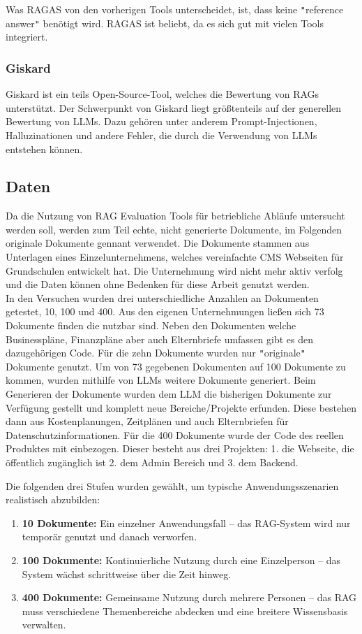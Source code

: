 Was RAGAS von den vorherigen Tools unterscheidet, ist, dass keine \texttt{"}reference answer\texttt{"} benötigt wird.
RAGAS ist beliebt, da es sich gut mit vielen Tools integriert. \cite{ragas_integrations_2025}

\subsubsection{Giskard}
Giskard ist ein teils Open-Source-Tool, welches die Bewertung von RAGs unterstützt.
Der Schwerpunkt von Giskard liegt größtenteils auf der generellen Bewertung von LLMs.
Dazu gehören unter anderem Prompt-Injectionen, Halluzinationen und andere Fehler, die durch die Verwendung von LLMs entstehen können.



\subsection{Daten}
Da die Nutzung von RAG Evaluation Tools für betriebliche Abläufe untersucht werden soll, werden zum Teil echte, nicht generierte Dokumente, im Folgenden originale Dokumente gennant verwendet.
Die Dokumente stammen aus Unterlagen eines Einzelunternehmens, welches vereinfachte CMS Webseiten für Grundschulen entwickelt hat. Die Unternehmung wird nicht mehr aktiv verfolg und die Daten können ohne Bedenken für diese Arbeit genutzt werden.\\
In den Versuchen wurden drei unterschiedliche Anzahlen an Dokumenten getestet, 10, 100 und 400.
Aus den eigenen Unternehmungen ließen sich 73 Dokumente finden die nutzbar sind. Neben den Dokumenten welche Businesspläne, Finanzpläne aber auch Elternbriefe umfassen gibt es den dazugehörigen Code.
Für die zehn Dokumente wurden nur \texttt{"}originale\texttt{"} Dokumente genutzt. Um von 73 gegebenen Dokumenten auf 100 Dokumente zu kommen, wurden mithilfe von LLMs weitere Dokumente generiert.
Beim Generieren der Dokumente wurden dem LLM die bisherigen Dokumente zur Verfügung gestellt und komplett neue Bereiche/Projekte erfunden. Diese bestehen dann aus Kostenplanungen, Zeitplänen und auch Elternbriefen für Datenschutzinformationen.
Für die 400 Dokumente wurde der Code des reellen Produktes mit einbezogen. Dieser besteht aus drei Projekten: 1. die Webseite, die öffentlich zugänglich ist 2. dem Admin Bereich und 3. dem Backend. 

Die folgenden drei Stufen wurden gewählt, um typische Anwendungsszenarien realistisch abzubilden:
\begin{enumerate}
    \item \textbf{10 Dokumente:} Ein einzelner Anwendungsfall – das RAG-System wird nur temporär genutzt und danach verworfen.
    \item \textbf{100 Dokumente:} Kontinuierliche Nutzung durch eine Einzelperson – das System wächst schrittweise über die Zeit hinweg.
    \item \textbf{400 Dokumente:} Gemeinsame Nutzung durch mehrere Personen – das RAG muss verschiedene Themenbereiche abdecken und eine breitere Wissensbasis verwalten.
\end{enumerate}



